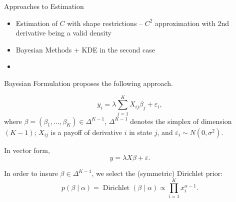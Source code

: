 \documentclass[10pt,aspectratio=43]{beamer}
\begin{document}
\begin{frame}{Approaches to Estimation}
    \begin{itemize}  \setlength\itemsep{1em}
        \item Estimation of $C$ with shape restrictions -- $C^2$ approximation with 2nd derivative being a valid density {\small\parencite{ait-sahaliaNonparametricOptionPricing2003}}
        \item Bayesian Methods {\small\parencite{fisherSimplexRegression2016,hardleStatePriceDensities2015} + KDE in the second case}
        \item 
    \end{itemize}
\end{frame}

\begin{frame}{Bayesian Formulation}
    \cite{fisherSimplexRegression2016} proposes the following approach.

    \[y_i=\lambda\sum_{j=1}^KX_{ij}\beta_j+\varepsilon_i,\]
    where $\beta=(\beta_1,\dots, \beta_K)\in \Delta^{K-1}$, $\Delta^{K-1}$ denotes the simplex of dimension $(K-1)$; $X_{ij}$ is a payoff of derivative $i$ in state $j$, and $\varepsilon_i\sim N(0,\sigma^2)$.

    In vector form,
    \[y=\lambda X \beta+\varepsilon.\]

    In order to insure $\beta\in \Delta^{K-1}$, we select the (symmetric) Dirichlet prior:
    \[p(\beta\mid \alpha)=\operatorname{Dirichlet}(\beta\mid \alpha)\propto \prod_{i=1}^{K}x_{i}^{\alpha-1}.\]

\end{frame}
\end{document}
